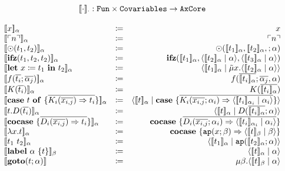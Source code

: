 \documentclass[nonacm]{acmart}
\newcommand{\translate}[1]{\ensuremath{[\![#1]\!]}}
\newcommand{\lit}[1]{\ensuremath{\ulcorner #1\urcorner}}
\newcommand{\cut}[2]{\ensuremath{\langle #1 \mid #2 \rangle}}
\newcommand{\letin}[3]{\ensuremath{\mathbf{let}\ #1 \coloneq #2\ \mathbf{in}\ #3}}
\newcommand{\caseof}[2]{\ensuremath{\mathbf{case}\ #1\ \mathbf{of}\ \{ #2 \}}}
\begin{document}
\vspace{2em}
\[
  \begin{array}{l c r}
    \multicolumn{3}{c}{\translate{\cdot}_{\cdot} : \mathtt{Fun}\times \mathtt{Covariables} \rightarrow \mathtt{AxCore}}\\
    \\
    \translate{x}_{\alpha} & \coloneq & x\\
    \translate{\lit{n}}_{\alpha} & \coloneq & \lit{n}\\
    \translate{\odot(t_1,t_2)}_{\alpha} & \coloneq & \odot(\translate{t_1}_{\alpha},\translate{t_2}_{\alpha},;\alpha)\\
    \translate{\mathbf{ifz}(t_1,t_2,t_2)}_{\alpha} & \coloneq & \mathbf{ifz}(\translate{t_1}_{\alpha},\cut{\translate{t_2}_{\alpha}}{\alpha},\cut{\translate{t_3}_{\alpha}}{\alpha})\\
    \translate{\letin{x}{t_1}{t_2}}_{\alpha} & \coloneq & \cut{\translate{t_1}_{\alpha}}{\tilde{\mu}x.\cut{\translate{t_2}_{\alpha}}{\alpha}}\\
    \translate{f(\overline{t_i};\overline{\alpha_j})}_{\alpha} & \coloneq & f(\overline{\translate{t_i}_{\alpha}};\overline{\alpha_j},\alpha)\\
    \translate{K(\overline{t_i})}_{\alpha} & \coloneq & K(\overline{\translate{t_i}_{\alpha}})\\
    \translate{\caseof{t}{\overline{K_i(\overline{x_{i,j}})\Rightarrow t_i}}}_{\alpha} & \coloneq & \cut{\translate{t}_{\alpha}}{\mathbf{case}\ \{\overline{K_i(\overline{x_{i,j}};\alpha_i)\Rightarrow \cut{\translate{t_i}_{\alpha_i}}{\alpha_i}}\}}\\
    \translate{t.D(\overline{t_i})}_{\alpha} & \coloneq & \cut{\translate{t}_{\alpha}}{D(\overline{\translate{t_i}_{\alpha}};\alpha)}\\
    \translate{\mathbf{cocase}\ \{\overline{D_i(\overline{x_{i,j}}) \Rightarrow t_i}\}}_{\alpha} & \coloneq & \mathbf{cocase}\ \{\overline{D_i(\overline{x_{i,j}};\alpha_i) \Rightarrow \cut{\translate{t_i}_{\alpha_i}}{\alpha_i}}\}\\
    \translate{\lambda x.t}_{\alpha} & \coloneq & \mathbf{cocase}\ \{ \mathtt{ap}(x;\beta) \Rightarrow \cut{\translate{t}_{\beta}}{\beta} \} \\
    \translate{t_1\ t_2}_{\alpha} & \coloneq & \cut{\translate{t_1}_{\alpha}}{\mathtt{ap}(\translate{t_2}_{\alpha};\alpha)}\\
    \translate{\mathbf{label}\ \alpha\ \{t\}}_{\beta} & \coloneq & \cut{\translate{t}_{\alpha}}{\alpha}\\
    \translate{\mathbf{goto}(t;\alpha)} & \coloneq & \mu\beta.\cut{\translate{t}_{\beta}}{\alpha}\\
  \end{array}
\]
\end{document}
